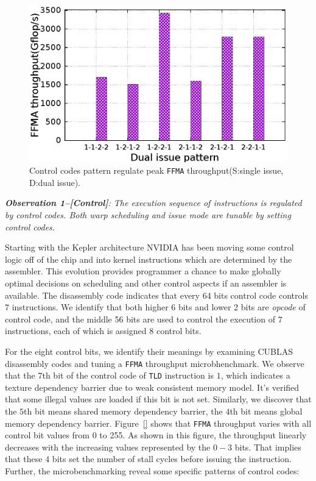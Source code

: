 \documentclass{sig-alternate-05-2015}
\begin{document}
\begin{figure}[htbp]
\begin{center}
\includegraphics[scale=0.5]{pattern}
    \caption{Control codes pattern regulate peak {\tt FFMA} throughput(S:single issue, D:dual issue).}
\label{fig:control}
\end{center}
\end{figure}

{\em {\bf Observation 1--[Control]}: The execution sequence of instructions is regulated by control codes. Both warp scheduling and issue mode are tunable by setting control codes.}

Starting with the Kepler architecture NVIDIA has been moving some control logic off of the chip and into kernel instructions which are determined by the assembler. This evolution provides programmer a chance to make globally optimal decisions on scheduling and other control aspects if an assembler is available. The disassembly code indicates that every 64 bits control code controls $7$ instructions. We identify that both higher $6$ bits and lower 2 bits are {\em opcode} of control code, and the middle 56 bits are used to control the execution of $7$ instructions, each of which is assigned $8$ control bits.

For the eight control bits, we identify their meanings by examining CUBLAS disassembly codes and tuning a {\tt FFMA} throughput microbhenchmark. We observe that the $7$th bit of the control code of {\tt TLD} instruction is $1$, which indicates a texture dependency barrier due to weak consistent memory model. It's verified that some illegal values are loaded if this bit is not set. Similarly, we discover that the $5$th bit means shared memory dependency barrier, the $4$th bit means global memory dependency barrier. Figure~\ref{} shows that {\tt FFMA} throughput varies with all control bit values from 0 to 255. As shown in this figure, the throughput linearly decreases with the increasing values represented by the $0-3$ bits. That implies that these $4$ bits set the number of stall cycles before issuing the instruction. Further, the microbenchmarking reveal some specific patterns of control codes:
\end{document}
